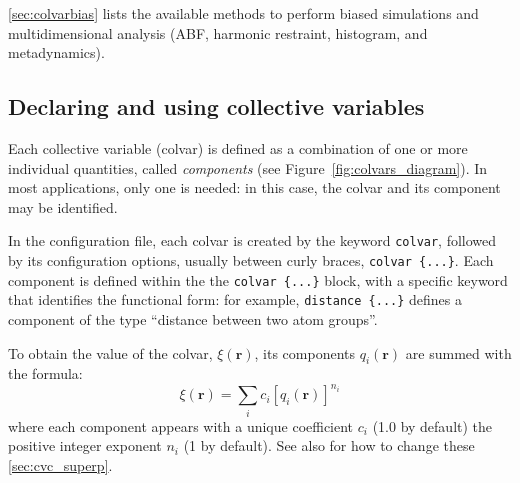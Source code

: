 \ref{sec:colvarbias} lists the available methods to perform biased
simulations and multidimensional analysis (ABF, harmonic restraint,
histogram, and metadynamics).


\subsection{Declaring and using collective variables}
\label{sec:colvar}

Each collective variable (colvar) is defined as a combination of one
or more individual quantities, called \emph{components} (see
Figure~\ref{fig:colvars_diagram}).  In most applications, only one is
needed: in this case, the colvar and its component may be identified.

In the configuration file, each colvar is created by the keyword
\texttt{colvar}, followed by its configuration options, usually
between curly braces, \texttt{colvar~\{...\}}.  Each component is
defined within the the \texttt{colvar~\{...\}} block, with a specific
keyword that identifies the functional form: for example,
\texttt{distance \{...\}} defines a component of the type ``distance
between two atom groups''.

To obtain the value of the colvar, $\xi(\mathbf{r})$, its components
$q_{i}(\mathbf{r})$ are summed with the formula:
\begin{equation}
  \label{eq:colvar_combination}
  \xi(\mathbf{r}) = \sum_{i} c_{i} [q_{i}(\mathbf{r})]^{n_{i}}
\end{equation}
where each component appears with a unique coefficient $c_{i}$ (1.0 by
default) the positive integer exponent $n_{i}$ (1 by default).  See
also for how to change these \ref{sec:cvc_superp}.

